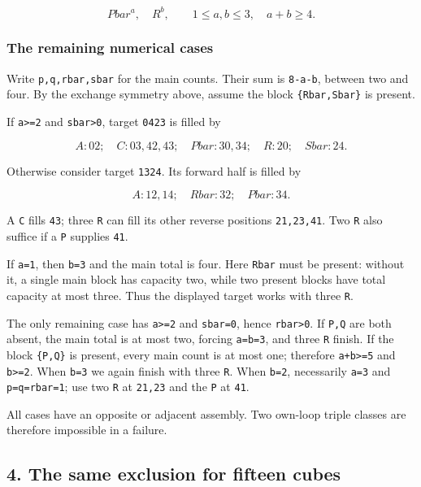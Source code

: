 \documentclass[
  10pt,
]{article}
\begin{document}
\[
Pbar^a,\quad R^b,\qquad 1\le a,b\le3,\quad a+b\ge4.
\]

\hypertarget{the-remaining-numerical-cases}{%
\subsubsection*{The remaining numerical
cases}\label{the-remaining-numerical-cases}}

Write \texttt{p,q,rbar,sbar} for the main counts. Their sum is
\texttt{8-a-b}, between two and four. By the exchange symmetry above,
assume the block \texttt{\{Rbar,Sbar\}} is present.

If \texttt{a\textgreater{}=2} and \texttt{sbar\textgreater{}0}, target
\texttt{04\textbar{}23} is filled by

\[
A:02;\quad C:03,42,43;\quad Pbar:30,34;\quad
R:20;\quad Sbar:24.
\]

Otherwise consider target \texttt{13\textbar{}24}. Its forward half is
filled by

\[
A:12,14;\quad Rbar:32;\quad Pbar:34.
\]

A \texttt{C} fills \texttt{43}; three \texttt{R} can fill its other
reverse positions \texttt{21,23,41}. Two \texttt{R} also suffice if a
\texttt{P} supplies \texttt{41}.

If \texttt{a=1}, then \texttt{b=3} and the main total is four. Here
\texttt{Rbar} must be present: without it, a single main block has
capacity two, while two present blocks have total capacity at most
three. Thus the displayed target works with three \texttt{R}.

The only remaining case has \texttt{a\textgreater{}=2} and
\texttt{sbar=0}, hence \texttt{rbar\textgreater{}0}. If \texttt{P,Q} are
both absent, the main total is at most two, forcing \texttt{a=b=3}, and
three \texttt{R} finish. If the block \texttt{\{P,Q\}} is present, every
main count is at most one; therefore \texttt{a+b\textgreater{}=5} and
\texttt{b\textgreater{}=2}. When \texttt{b=3} we again finish with three
\texttt{R}. When \texttt{b=2}, necessarily \texttt{a=3} and
\texttt{p=q=rbar=1}; use two \texttt{R} at \texttt{21,23} and the
\texttt{P} at \texttt{41}.

All cases have an opposite or adjacent assembly. Two own-loop triple
classes are therefore impossible in a failure.

\hypertarget{the-same-exclusion-for-fifteen-cubes}{%
\subsection*{4. The same exclusion for fifteen
cubes}\label{the-same-exclusion-for-fifteen-cubes}}
\end{document}
